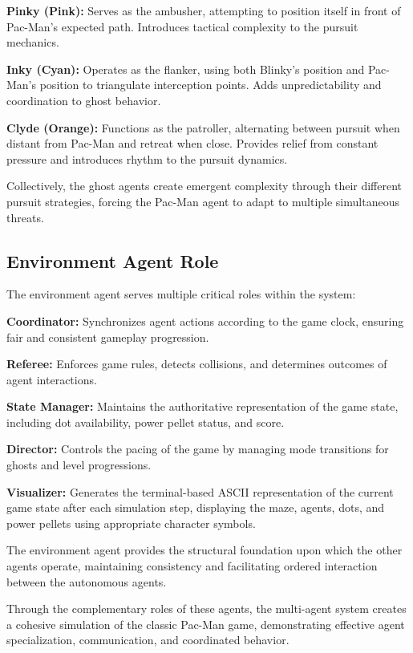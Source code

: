 \documentclass[a4paper, 11pt]{article}
\begin{document}
\textbf{Pinky (Pink):} Serves as the ambusher, attempting to position itself in front of Pac-Man's expected path. Introduces tactical complexity to the pursuit mechanics.

\textbf{Inky (Cyan):} Operates as the flanker, using both Blinky's position and Pac-Man's position to triangulate interception points. Adds unpredictability and coordination to ghost behavior.

\textbf{Clyde (Orange):} Functions as the patroller, alternating between pursuit when distant from Pac-Man and retreat when close. Provides relief from constant pressure and introduces rhythm to the pursuit dynamics.

Collectively, the ghost agents create emergent complexity through their different pursuit strategies, forcing the Pac-Man agent to adapt to multiple simultaneous threats.

\subsection{Environment Agent Role}
The environment agent serves multiple critical roles within the system:

\textbf{Coordinator:} Synchronizes agent actions according to the game clock, ensuring fair and consistent gameplay progression.

\textbf{Referee:} Enforces game rules, detects collisions, and determines outcomes of agent interactions.

\textbf{State Manager:} Maintains the authoritative representation of the game state, including dot availability, power pellet status, and score.

\textbf{Director:} Controls the pacing of the game by managing mode transitions for ghosts and level progressions.

\textbf{Visualizer:} Generates the terminal-based ASCII representation of the current game state after each simulation step, displaying the maze, agents, dots, and power pellets using appropriate character symbols.

The environment agent provides the structural foundation upon which the other agents operate, maintaining consistency and facilitating ordered interaction between the autonomous agents.

Through the complementary roles of these agents, the multi-agent system creates a cohesive simulation of the classic Pac-Man game, demonstrating effective agent specialization, communication, and coordinated behavior.

%
% 
% 
\end{document}

